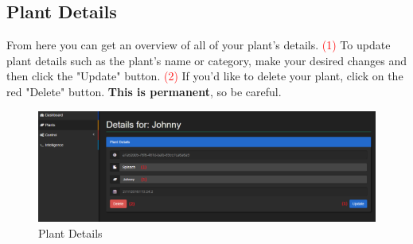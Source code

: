 \documentclass{article}
\begin{document}
	\subsection{Plant Details}
	\label{sec:plant-details}
	From here you can get an overview of all of your plant's details.
	\newline
	\textcolor{red}{(1)} To update plant details such as the plant's name or category, make your desired changes and then click the "Update" button.
	\newline
	\textcolor{red}{(2)} If you'd like to delete your plant, click on the red "Delete" button. \textbf{This is permanent}, so be careful.
	\begin{figure}[H]
		\includegraphics[width=\textwidth]{../images/UserManual/plant-details.PNG}
		\caption{Plant Details}
	\end{figure}
\end{document}
